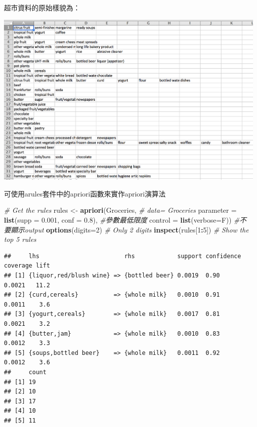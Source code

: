 \documentclass[
]{book}
\newenvironment{Shaded}{\begin{snugshade}}{\end{snugshade}}
\newcommand{\CommentTok}[1]{\textcolor[rgb]{0.56,0.35,0.01}{\textit{#1}}}
\newcommand{\DataTypeTok}[1]{\textcolor[rgb]{0.13,0.29,0.53}{#1}}
\newcommand{\DecValTok}[1]{\textcolor[rgb]{0.00,0.00,0.81}{#1}}
\newcommand{\FloatTok}[1]{\textcolor[rgb]{0.00,0.00,0.81}{#1}}
\newcommand{\KeywordTok}[1]{\textcolor[rgb]{0.13,0.29,0.53}{\textbf{#1}}}
\newcommand{\NormalTok}[1]{#1}
\newcommand{\OperatorTok}[1]{\textcolor[rgb]{0.81,0.36,0.00}{\textbf{#1}}}
\newcommand{\StringTok}[1]{\textcolor[rgb]{0.31,0.60,0.02}{#1}}
\begin{document}
超市資料的原始樣貌為：

\includegraphics[width=21.61in]{figure/groceries}

可使用arules套件中的apriori函數來實作apriori演算法

\begin{Shaded}
\begin{Highlighting}[]
\CommentTok{# Get the rules}
\NormalTok{rules <-}\StringTok{ }\KeywordTok{apriori}\NormalTok{(Groceries, }\CommentTok{# data= Groceries}
                 \DataTypeTok{parameter =} \KeywordTok{list}\NormalTok{(}\DataTypeTok{supp =} \FloatTok{0.001}\NormalTok{, }\DataTypeTok{conf =} \FloatTok{0.8}\NormalTok{), }\CommentTok{#參數最低限度}
                 \DataTypeTok{control =} \KeywordTok{list}\NormalTok{(}\DataTypeTok{verbose=}\NormalTok{F)) }\CommentTok{#不要顯示output}
\KeywordTok{options}\NormalTok{(}\DataTypeTok{digits=}\DecValTok{2}\NormalTok{) }\CommentTok{# Only 2 digits}
\KeywordTok{inspect}\NormalTok{(rules[}\DecValTok{1}\OperatorTok{:}\DecValTok{5}\NormalTok{]) }\CommentTok{# Show the top 5 rules}
\end{Highlighting}
\end{Shaded}

\begin{verbatim}
##     lhs                        rhs            support confidence coverage lift
## [1] {liquor,red/blush wine} => {bottled beer} 0.0019  0.90       0.0021   11.2
## [2] {curd,cereals}          => {whole milk}   0.0010  0.91       0.0011    3.6
## [3] {yogurt,cereals}        => {whole milk}   0.0017  0.81       0.0021    3.2
## [4] {butter,jam}            => {whole milk}   0.0010  0.83       0.0012    3.3
## [5] {soups,bottled beer}    => {whole milk}   0.0011  0.92       0.0012    3.6
##     count
## [1] 19   
## [2] 10   
## [3] 17   
## [4] 10   
## [5] 11
\end{verbatim}
\end{document}

